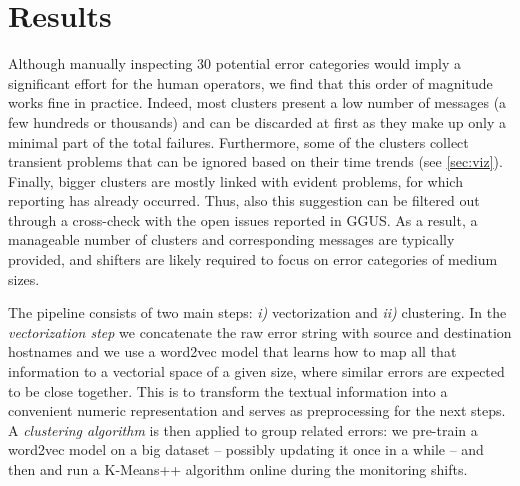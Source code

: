\chapter{Results} 
\label{ch:opint-results}

Although manually inspecting 30 potential error categories would imply a significant effort for the human operators, we find that this order of magnitude works fine in practice.
Indeed, most clusters present a low number of messages (a few hundreds or thousands) and can be discarded at first as they make up only a minimal part of the total failures. 
Furthermore, some of the clusters collect transient problems that can be ignored based on their time trends (see \cref{sec:viz}).
Finally, bigger clusters are mostly linked with evident problems, for which reporting has already occurred. Thus, also this suggestion can be filtered out through a cross-check with the open issues reported in GGUS.
As a result, a manageable number of clusters and corresponding messages are typically provided, and shifters are likely required to focus on error categories of medium sizes.

The pipeline consists of 
two main steps: \textit{i)} vectorization and \textit{ii)} clustering.
In the {\emph{vectorization step}} we concatenate the raw error string with source and destination hostnames and we use a word2vec model that learns how to map all that information to a vectorial space of a given size, where similar errors are expected to be close together. This is to transform the textual information into a convenient numeric representation and serves as preprocessing for the next steps. 
A {\emph{clustering algorithm}} is then applied to group related errors: 
we pre-train a word2vec model on a big dataset 
-- possibly updating it once in a while -- and then 
and run a \mbox{K-Means++} algorithm \cite{kmeans} online during the monitoring shifts.  
% 


